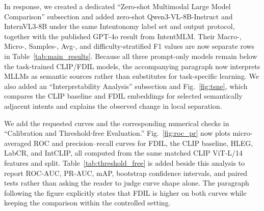 {
}

{In response, we created a dedicated ``Zero-shot Multimodal Large Model Comparison'' subsection and added zero-shot Qwen3-VL-8B-Instruct and InternVL3-8B under the same Intentonomy label set and output protocol, together with the published GPT-4o result from IntentMLM. Their Macro-, Micro-, Samples-, Avg-, and difficulty-stratified F1 values are now separate rows in Table~\ref{tab:main_results}. Because all three prompt-only models remain below the task-trained CLIP/FDIL models, the accompanying paragraph now interprets MLLMs as semantic sources rather than substitutes for task-specific learning. We also added an ``Interpretability Analysis'' subsection and Fig.~\ref{fig:tsne}, which compares the CLIP baseline and FDIL embeddings for selected semantically adjacent intents and explains the observed change in local separation.
}
\showMainResults
\showTsne

{We add the requested curves and the corresponding numerical checks in ``Calibration and Threshold-free Evaluation.'' Fig.~\ref{fig:roc_pr} now plots micro-averaged ROC and precision--recall curves for FDIL, the CLIP baseline, HLEG, LabCR, and IntCLIP, all computed from the same matched CLIP ViT-L/14 features and split. Table~\ref{tab:threshold_free} is added beside this analysis to report ROC-AUC, PR-AUC, mAP, bootstrap confidence intervals, and paired tests rather than asking the reader to judge curve shape alone. The paragraph following the figure explicitly states that FDIL is higher on both curves while keeping the comparison within the controlled setting.
}
\showThresholdFree
\showRocPr


